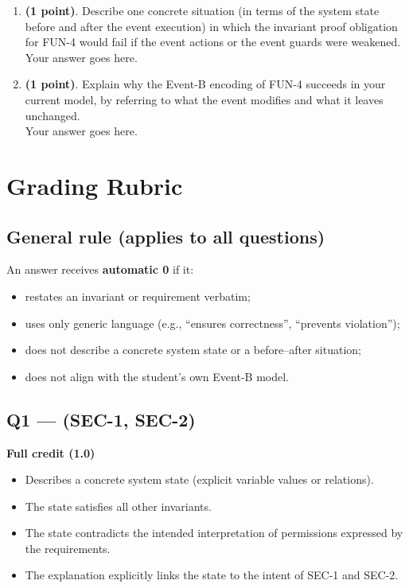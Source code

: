 \documentclass{article} %
\begin{document}
\begin{enumerate}[leftmargin=*, label=\textbf{Q\arabic*}, itemsep=-5pt]
\begin{enumerate}[leftmargin=*, label=(\textbf{\alph*}), itemsep=-5pt]
\item \textbf{(1 point)}. Describe one concrete situation (in terms of the system state before and after the event execution) in which the invariant proof obligation for FUN-4 would fail if the event actions or the event guards were weakened. \\
  {\color{blue}Your answer goes here.  \\ 
  }
  \item \textbf{(1 point)}. Explain why the Event-B encoding of FUN-4 succeeds in your current model, by referring to what the event modifies and what it leaves unchanged. \\
  {\color{blue}Your answer goes here.}  \\ 
    \end{enumerate}  
\end{enumerate}


\section*{Grading Rubric}

\subsection*{General rule (applies to all questions)}

An answer receives \textbf{automatic 0} if it:
\begin{itemize}
  \item restates an invariant or requirement verbatim;
  \item uses only generic language (e.g., ``ensures correctness'', ``prevents violation'');
  \item does not describe a concrete system state or a before--after situation;
  \item does not align with the student’s own Event-B model.
\end{itemize}

\bigskip

\subsection*{Q1 --- (SEC-1, SEC-2) }

\noindent
\textbf{Full credit (1.0)}
\begin{itemize}
  \item Describes a concrete system state (explicit variable values or relations).
  \item The state satisfies all other invariants.
  \item The state contradicts the intended interpretation of permissions expressed by
    the requirements. 
  \item The explanation explicitly links the state to the intent of SEC-1 and SEC-2.
\end{itemize}
\end{document}
